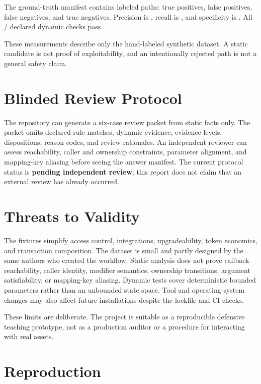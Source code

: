 \documentclass[11pt]{article}
\begin{document}
The ground-truth manifest contains \LabeledPathCount{} labeled paths: \TruePositiveCount{} true positives, \FalsePositiveCount{} false positives, \FalseNegativeCount{} false negatives, and \TrueNegativeCount{} true negatives. Precision is \PrecisionPercent{}, recall is \RecallPercent{}, and specificity is \SpecificityPercent{}. All \DynamicPassedCount{}/\DynamicCheckCount{} declared dynamic checks pass.

These measurements describe only the hand-labeled synthetic dataset. A static candidate is not proof of exploitability, and an intentionally rejected path is not a general safety claim.

\section{Blinded Review Protocol}

The repository can generate a six-case review packet from static facts only. The packet omits declared-rule matches, dynamic evidence, evidence levels, dispositions, reason codes, and review rationales. An independent reviewer can assess reachability, caller and ownership constraints, parameter alignment, and mapping-key aliasing before seeing the answer manifest. The current protocol status is \textbf{pending independent review}; this report does not claim that an external review has already occurred.

\section{Threats to Validity}

The fixtures simplify access control, integrations, upgradeability, token economics, and transaction composition. The dataset is small and partly designed by the same authors who created the workflow. Static analysis does not prove callback reachability, caller identity, modifier semantics, ownership transitions, argument satisfiability, or mapping-key aliasing. Dynamic tests cover deterministic bounded parameters rather than an unbounded state space. Tool and operating-system changes may also affect future installations despite the lockfile and CI checks.

These limits are deliberate. The project is suitable as a reproducible defensive teaching prototype, not as a production auditor or a procedure for interacting with real assets.

\section{Reproduction}
\end{document}
